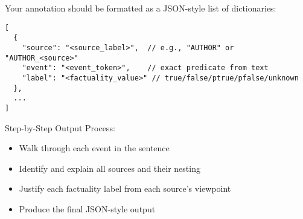 \begin{figure*}[!ht]
\begin{tcolorbox}[
    width=\textwidth,
    colback=white,
    colframe=black,
    arc=4mm,
    boxrule=0.5pt,
    left=2mm,
    right=2mm,
    top=2mm,
    bottom=2mm,
    fonttitle=\bfseries,
    ]
\begin{tcolorbox}[
    colback=SkyBlue!10,
    boxrule=0pt,
    colframe=white,
    left=0pt,
    right=0pt,
    top=0pt,
    bottom=0pt,
    ]

\small
Your annotation should be formatted as a JSON-style list of dictionaries:

\begin{verbatim}
[
  {
    "source": "<source_label>",  // e.g., "AUTHOR" or "AUTHOR_<source>"
    "event": "<event_token>",    // exact predicate from text
    "label": "<factuality_value>" // true/false/ptrue/pfalse/unknown
  },
  ...
]
\end{verbatim}

Step-by-Step Output Process:
\begin{itemize}[noitemsep, leftmargin=15pt, topsep=0pt]
    \item Walk through each event in the sentence
    \item Identify and explain all sources and their nesting
    \item Justify each factuality label from each source's viewpoint
    \item Produce the final JSON-style output
\end{itemize}

\end{tcolorbox}
\end{tcolorbox}
\label{fig:hybrid-prompt}
\end{figure*}
